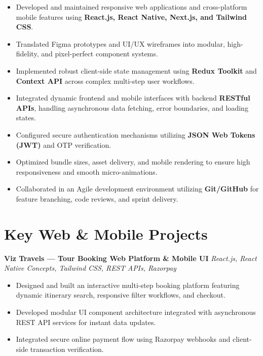 \documentclass[a4paper,10pt]{article}
\begin{document}
\begin{itemize}

    \item Developed and maintained responsive web applications and cross-platform mobile features using \textbf{React.js, React Native, Next.js, and Tailwind CSS}.

    \item Translated Figma prototypes and UI/UX wireframes into modular, high-fidelity, and pixel-perfect component systems.

    \item Implemented robust client-side state management using \textbf{Redux Toolkit} and \textbf{Context API} across complex multi-step user workflows.

    \item Integrated dynamic frontend and mobile interfaces with backend \textbf{RESTful APIs}, handling asynchronous data fetching, error boundaries, and loading states.

    \item Configured secure authentication mechanisms utilizing \textbf{JSON Web Tokens (JWT)} and OTP verification.

    \item Optimized bundle sizes, asset delivery, and mobile rendering to ensure high responsiveness and smooth micro-animations.

    \item Collaborated in an Agile development environment utilizing \textbf{Git/GitHub} for feature branching, code reviews, and sprint delivery.

\end{itemize}

\section*{Key Web \& Mobile Projects}

\textbf{Viz Travels --- Tour Booking Web Platform \& Mobile UI}
\hfill
\textit{React.js, React Native Concepts, Tailwind CSS, REST APIs, Razorpay}

\begin{itemize}

    \item Designed and built an interactive multi-step booking platform featuring dynamic itinerary search, responsive filter workflows, and checkout.

    \item Developed modular UI component architecture integrated with asynchronous REST API services for instant data updates.

    \item Integrated secure online payment flow using Razorpay webhooks and client-side transaction verification.

\end{itemize}
\end{document}
